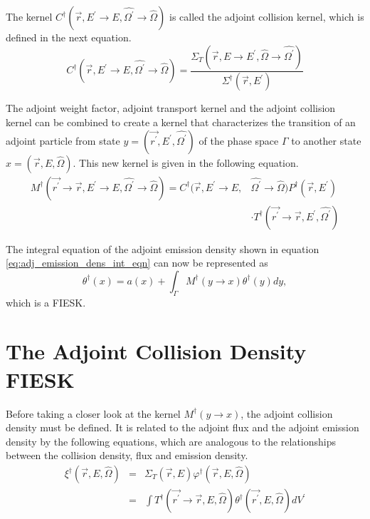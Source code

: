 The kernel $C^{\dagger}(\vec{r},E^{'} \to E,\hat{\Omega^{'}} \to \hat{\Omega})$ is
called the adjoint collision kernel, which is defined in the next equation.
\begin{equation}
  C^{\dagger}(\vec{r},E^{'} \to E,\hat{\Omega^{'}} \to \hat{\Omega}) = 
  \frac{\Sigma_T(\vec{r},E \to E^{'},\hat{\Omega} \to \hat{\Omega^{'}})}
       {\Sigma^{\dagger}(\vec{r},E^{'})}
  \label{eq:adj_collision_kernel}
\end{equation}

The adjoint weight factor, adjoint transport kernel and the adjoint collision
kernel can be combined to create a kernel that characterizes the transition of
an adjoint particle from state $y = (\vec{r^{'}},E^{'},\hat{\Omega^{'}})$ of the 
phase space $\Gamma$ to another state $x = (\vec{r},E,\hat{\Omega})$. This new 
kernel is given in the following equation.
\begin{equation}
  \begin{split}
    M^{\dagger}(\vec{r^{'}} \to \vec{r},E^{'} \to E,\hat{\Omega^{'}} \to \hat{\Omega})
    = C^{\dagger}(\vec{r},E^{'} \to E,&\hat{\Omega^{'}} \to \hat{\Omega})
    P^{\dagger}(\vec{r},E^{'}) \\
    & \cdot T^{\dagger}(\vec{r^{'}} \to \vec{r},E^{'},\hat{\Omega^{'}})
  \end{split}
\end{equation}

The integral equation of the adjoint emission density shown in equation 
\ref{eq:adj_emission_dens_int_eqn} can now be represented as
\begin{equation*}
  \theta^{\dagger}(x) = a(x) + \int_{\Gamma}M^{\dagger}(y \to x) \theta^{\dagger}(y)dy,
\end{equation*}
which is a FIESK.

\section{The Adjoint Collision Density FIESK}
Before taking a closer look at the kernel $M^{\dagger}(y \to x)$, the adjoint
collision density must be defined. It is related to the adjoint flux and the
adjoint emission density by the following equations, which are analogous to
the relationships between the collision density, flux and emission density.
\begin{eqnarray}
  \xi^{\dagger}(\vec{r},E,\hat{\Omega}) & = & \Sigma_T(\vec{r},E)
  \varphi^{\dagger}(\vec{r},E,\hat{\Omega}) \\
  & = & \int T^{\dagger}(\vec{r^{'}} \to \vec{r},E,\hat{\Omega})
  \theta^{\dagger}(\vec{r^{'}},E,\hat{\Omega}) dV^{'}
  \label{eq:adj_collision_dens_to_adj_emission_dens}
\end{eqnarray}


